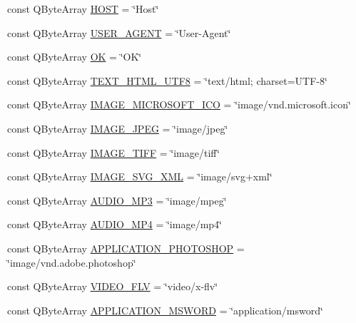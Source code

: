 \begin{DoxyCompactItemize}
\item 
const Q\+Byte\+Array \hyperlink{namespace_h_t_t_p_a39385b512373b40fc1dea38d4c27373b}{H\+O\+ST} = \char`\"{}Host\char`\"{}
\item 
const Q\+Byte\+Array \hyperlink{namespace_h_t_t_p_aeed91747e654d4d8719046c83c5c320d}{U\+S\+E\+R\+\_\+\+A\+G\+E\+NT} = \char`\"{}User-\/Agent\char`\"{}
\item 
const Q\+Byte\+Array \hyperlink{namespace_h_t_t_p_a8aee192633177f54fa8b7d1419274023}{OK} = \char`\"{}OK\char`\"{}
\item 
const Q\+Byte\+Array \hyperlink{namespace_h_t_t_p_ada8fc984a468d82b4e29151245ca5983}{T\+E\+X\+T\+\_\+\+H\+T\+M\+L\+\_\+\+U\+T\+F8} = \char`\"{}text/html; charset=U\+TF-\/8\char`\"{}
\item 
const Q\+Byte\+Array \hyperlink{namespace_h_t_t_p_ab17af69c785841b1c1a4910d54822b87}{I\+M\+A\+G\+E\+\_\+\+M\+I\+C\+R\+O\+S\+O\+F\+T\+\_\+\+I\+CO} = \char`\"{}image/vnd.\+microsoft.\+icon\char`\"{}
\item 
const Q\+Byte\+Array \hyperlink{namespace_h_t_t_p_a6e7854d911333c02312b5a51feee45c1}{I\+M\+A\+G\+E\+\_\+\+J\+P\+EG} = \char`\"{}image/jpeg\char`\"{}
\item 
const Q\+Byte\+Array \hyperlink{namespace_h_t_t_p_a33d3777b3478aeac9cec09676c40e7fd}{I\+M\+A\+G\+E\+\_\+\+T\+I\+FF} = \char`\"{}image/tiff\char`\"{}
\item 
const Q\+Byte\+Array \hyperlink{namespace_h_t_t_p_a8e7c56e91b271dd4915923cca22af7cc}{I\+M\+A\+G\+E\+\_\+\+S\+V\+G\+\_\+\+X\+ML} = \char`\"{}image/svg+xml\char`\"{}
\item 
const Q\+Byte\+Array \hyperlink{namespace_h_t_t_p_a91b593189274fd2353ed8d0738a884f3}{A\+U\+D\+I\+O\+\_\+\+M\+P3} = \char`\"{}image/mpeg\char`\"{}
\item 
const Q\+Byte\+Array \hyperlink{namespace_h_t_t_p_aac612baf7e02625b163def5a667e2449}{A\+U\+D\+I\+O\+\_\+\+M\+P4} = \char`\"{}image/mp4\char`\"{}
\item 
const Q\+Byte\+Array \hyperlink{namespace_h_t_t_p_ab7c1190e706f9896762d8471cfb2d478}{A\+P\+P\+L\+I\+C\+A\+T\+I\+O\+N\+\_\+\+P\+H\+O\+T\+O\+S\+H\+OP} = \char`\"{}image/vnd.\+adobe.\+photoshop\char`\"{}
\item 
const Q\+Byte\+Array \hyperlink{namespace_h_t_t_p_a50f56f9e688d4d6888b31d2dd4fb7297}{V\+I\+D\+E\+O\+\_\+\+F\+LV} = \char`\"{}video/x-\/flv\char`\"{}
\item 
const Q\+Byte\+Array \hyperlink{namespace_h_t_t_p_ac4944476780518bb9d8b314989799d15}{A\+P\+P\+L\+I\+C\+A\+T\+I\+O\+N\+\_\+\+M\+S\+W\+O\+RD} = \char`\"{}application/msword\char`\"{}

\end{DoxyCompactItemize}
